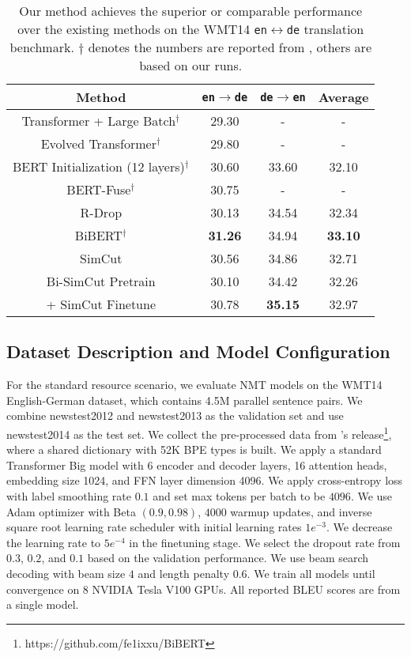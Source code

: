 \documentclass[11pt]{article}
\begin{document}
\begin{table*}
\centering
\begin{tabular}{c|c|c|c}
\hline
Method & \texttt{en}$\rightarrow$\texttt{de} & \texttt{de}$\rightarrow$\texttt{en} & Average \\
\hline\hline
Transformer + Large Batch$^{\dagger}$ \cite{ott2018scaling} & 29.30 & - & - \\
Evolved Transformer$^{\dagger}$ \cite{so2019evolved} & 29.80 & - & - \\
BERT Initialization (12 layers)$^{\dagger}$ \cite{rothe2020leveraging} & 30.60 & 33.60 & 32.10 \\
BERT-Fuse$^{\dagger}$ \cite{zhu2020incorporating} & 30.75 & - & - \\
R-Drop \cite{liang2021r} & 30.13 & 34.54 & 32.34 \\
BiBERT$^{\dagger}$ \cite{xu-etal-2021-bert} & \bf 31.26 & 34.94 & \bf 33.10 \\
\hline
SimCut & 30.56 & 34.86 & 32.71 \\
Bi-SimCut Pretrain & 30.10 & 34.42 & 32.26 \\
+ SimCut Finetune & 30.78 & \bf 35.15 & 32.97 \\
\end{tabular}
\caption{Our method achieves the superior or comparable performance over the existing methods on the WMT14 \texttt{en}$\leftrightarrow$\texttt{de} translation benchmark. $\dagger$ denotes the numbers are reported from \citet{xu-etal-2021-bert}, others are based on our runs. \label{ende}}
\end{table*}

\subsection{Dataset Description and Model Configuration}

For the standard resource scenario, we evaluate NMT models on the WMT14 English-German dataset, which contains 4.5M parallel sentence pairs. We combine newstest2012 and newstest2013 as the validation set and use newstest2014 as the test set. We collect the pre-processed data from \citet{xu-etal-2021-bert}'s release\footnote{https://github.com/fe1ixxu/BiBERT}, where a shared dictionary with 52K BPE types is built. We apply a standard Transformer Big model with 6 encoder and decoder layers, 16 attention heads, embedding size 1024, and FFN layer dimension 4096. We apply cross-entropy loss with label smoothing rate $0.1$ and set max tokens per batch to be $4096$. We use Adam optimizer with Beta $(0.9, 0.98)$, $4000$ warmup updates, and inverse square root learning rate scheduler with initial learning rates $1e^{-3}$. We decrease the learning rate to $5e^{-4}$ in the finetuning stage. We select the dropout rate from $0.3$, $0.2$, and $0.1$ based on the validation performance. We use beam search decoding with beam size $4$ and length penalty $0.6$. We train all models until convergence on 8 NVIDIA Tesla V100 GPUs. All reported BLEU scores are from a single model. 
\end{document}
